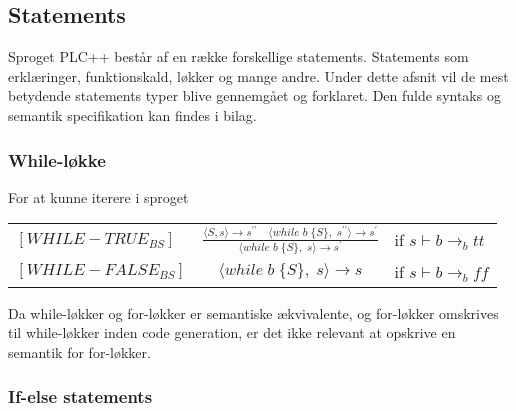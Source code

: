 \noindent \subsection{Statements}
Sproget PLC++ består af en række forskellige statements. Statements som erklæringer, funktionskald, løkker og mange andre. Under dette afsnit vil de mest betydende statements typer blive gennemgået og forklaret. Den fulde syntaks og semantik specifikation kan findes i bilag.





\noindent \subsubsection{While-løkke}
For at kunne iterere i sproget 



    \begin{semantik}
    \bgroup
    \def\arraystretch{3}
    \begin{table}[H]
    \centering
    \begin{tabular}{l c l}
        
        $[WHILE-TRUE_{BS}]$ & $
        \frac{\langle S, s\rangle  \rightarrow s^{\prime\prime} \quad \langle while\;b\;\{ S\},\;s^{\prime\prime}\rangle  \rightarrow s^{\prime}}
        {\langle while\;b\;\{ S\},\;s\rangle  \rightarrow s^{\prime}}
        $ & if $s \vdash b \rightarrow_b tt$ \\
        
        $[WHILE-FALSE_{BS}]$ & $
        \langle while\;b\;\{S\},\;s\rangle  \rightarrow s$ & 
        if $s \vdash b \rightarrow_b ff$ \\

    \end{tabular}
    \end{table}
    \egroup
    \caption{While-løkke}
    \label{sem:while}
    \end{semantik}
    
Da while-løkker og for-løkker er semantiske ækvivalente, og for-løkker omskrives til while-løkker inden code generation, er det ikke relevant at opskrive en semantik for for-løkker.

\noindent \subsubsection{If-else statements}

